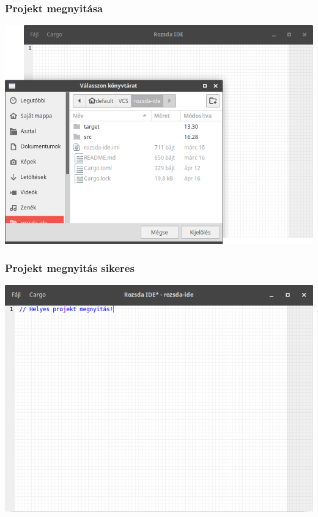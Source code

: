 \documentclass{beamer}
\begin{document}
    \begin{frame}[fragile]
        \frametitle{Projekt megnyitása}

        \begin{center}
            \includegraphics[scale=0.3]{kepek/projekt-megnyitas.png}
        \end{center}
    \end{frame}

    \begin{frame}[fragile]
        \frametitle{Projekt megnyitás sikeres}

        \begin{center}
            \includegraphics[scale=0.3]{kepek/projekt-megnyitas-sikeres.png}
        \end{center}
    \end{frame}
\end{document}
